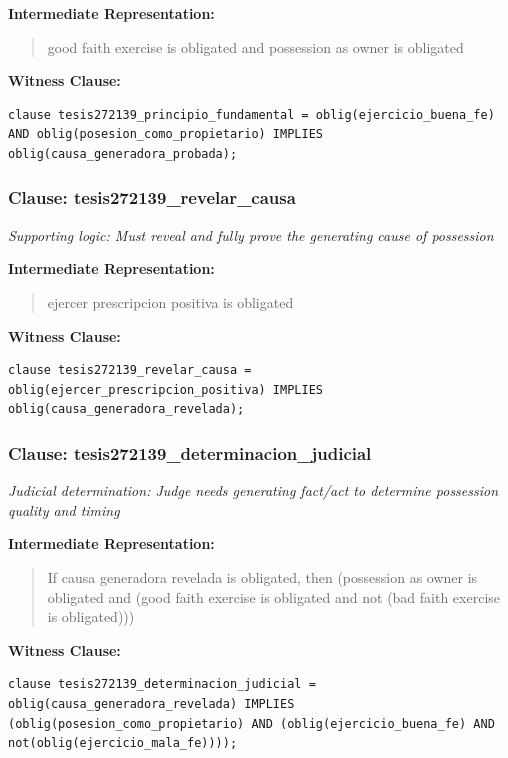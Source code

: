\documentclass[11pt,a4paper]{article}
\begin{document}
\textbf{Intermediate Representation:}

\begin{quote}
good faith exercise is obligated and possession as owner is obligated
\end{quote}

\textbf{Witness Clause:}

\begin{lstlisting}[style=witnessstyle, language=Witness]
clause tesis272139_principio_fundamental = oblig(ejercicio_buena_fe) AND oblig(posesion_como_propietario) IMPLIES oblig(causa_generadora_probada);
\end{lstlisting}

\subsubsection{Clause: tesis272139\_revelar\_causa}

\textit{Supporting logic: Must reveal and fully prove the generating cause of possession}

\textbf{Intermediate Representation:}

\begin{quote}
ejercer prescripcion positiva is obligated
\end{quote}

\textbf{Witness Clause:}

\begin{lstlisting}[style=witnessstyle, language=Witness]
clause tesis272139_revelar_causa = oblig(ejercer_prescripcion_positiva) IMPLIES oblig(causa_generadora_revelada);
\end{lstlisting}

\subsubsection{Clause: tesis272139\_determinacion\_judicial}

\textit{Judicial determination: Judge needs generating fact/act to determine possession quality and timing}

\textbf{Intermediate Representation:}

\begin{quote}
If causa generadora revelada is obligated, then (possession as owner is obligated and (good faith exercise is obligated and not (bad faith exercise is obligated)))
\end{quote}

\textbf{Witness Clause:}

\begin{lstlisting}[style=witnessstyle, language=Witness]
clause tesis272139_determinacion_judicial = oblig(causa_generadora_revelada) IMPLIES (oblig(posesion_como_propietario) AND (oblig(ejercicio_buena_fe) AND not(oblig(ejercicio_mala_fe))));
\end{lstlisting}
\end{document}
